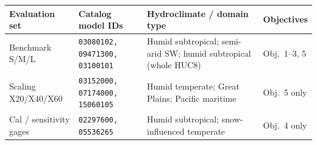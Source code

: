 \begin{tabular}{@{}p{2.5cm}p{4.2cm}p{4.8cm}p{2.0cm}@{}}
\toprule
Evaluation set & Catalog model IDs & Hydroclimate / domain type & Objectives \\
\midrule
Benchmark S/M/L & \texttt{03080102, 09471300, 03100101} & Humid subtropical; semi-arid SW; humid subtropical (whole HUC8) & Obj.~1--3, 5 \\
Scaling X20/X40/X60 & \texttt{03152000, 07174000, 15060105} & Humid temperate; Great Plains; Pacific maritime & Obj.~5 only \\
Cal / sensitivity gages & \texttt{02297600, 05536265} & Humid subtropical; snow-influenced temperate & Obj.~4 only \\
\bottomrule
\end{tabular}
